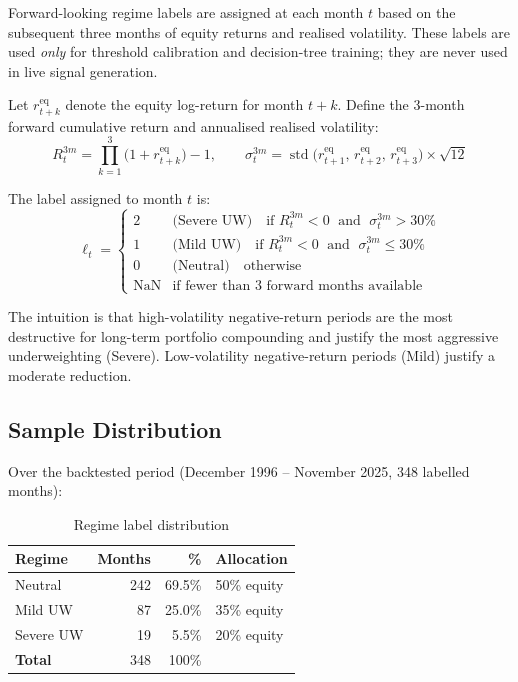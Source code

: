 \documentclass[11pt, a4paper]{article}
\begin{document}
Forward-looking regime labels are assigned at each month $t$ based on the
subsequent three months of equity returns and realised volatility. These
labels are used \emph{only} for threshold calibration and decision-tree
training; they are never used in live signal generation.

Let $r_{t+k}^{\text{eq}}$ denote the equity log-return for month $t+k$.
Define the 3-month forward cumulative return and annualised realised
volatility:
\[
  R_t^{3m} = \prod_{k=1}^{3}\bigl(1 + r_{t+k}^{\text{eq}}\bigr) - 1,
  \qquad
  \sigma_t^{3m} = \operatorname{std}\bigl(r_{t+1}^{\text{eq}},\,r_{t+2}^{\text{eq}},\,r_{t+3}^{\text{eq}}\bigr)\times\sqrt{12}
\]

The label assigned to month $t$ is:
\[
  \ell_t =
  \begin{cases}
    2 & \text{(Severe UW)} \quad \text{if } R_t^{3m} < 0 \;\text{ and }\; \sigma_t^{3m} > 30\% \\
    1 & \text{(Mild UW)}   \quad \text{if } R_t^{3m} < 0 \;\text{ and }\; \sigma_t^{3m} \leq 30\% \\
    0 & \text{(Neutral)}   \quad \text{otherwise} \\
    \text{NaN} & \text{if fewer than 3 forward months available}
  \end{cases}
\]

The intuition is that high-volatility negative-return periods are the
most destructive for long-term portfolio compounding and justify the
most aggressive underweighting (Severe). Low-volatility negative-return
periods (Mild) justify a moderate reduction.

\subsection{Sample Distribution}

Over the backtested period (December 1996 -- November 2025, 348 labelled months):

\begin{table}[H]
\centering
\caption{Regime label distribution}
\label{tab:labels}
\begin{tabular}{lrrl}
\toprule
\textbf{Regime} & \textbf{Months} & \textbf{\%} & \textbf{Allocation} \\
\midrule
Neutral         & 242 & 69.5\% & 50\% equity \\
Mild UW         &  87 & 25.0\% & 35\% equity \\
Severe UW       &  19 &  5.5\% & 20\% equity \\
\midrule
\textbf{Total}  & 348 & 100\%  & \\
\bottomrule
\end{tabular}
\end{table}
\end{document}
